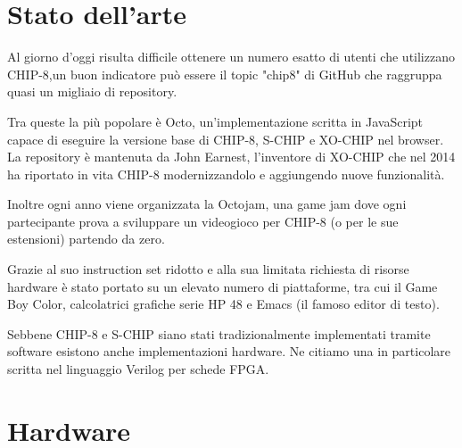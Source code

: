 \documentclass[a4paper]{article}
\begin{document}
\section{Stato dell'arte}

Al giorno d'oggi risulta difficile ottenere un numero esatto di utenti che
utilizzano CHIP-8,un buon indicatore può essere il topic "chip8" di GitHub
che raggruppa quasi un migliaio di repository.

Tra queste la più popolare è Octo, un'implementazione scritta in JavaScript
capace di eseguire la versione base di CHIP-8, S-CHIP e XO-CHIP nel browser.
La repository è mantenuta da John Earnest, l'inventore di XO-CHIP che nel 2014
ha riportato in vita CHIP-8 modernizzandolo e aggiungendo nuove funzionalità.

Inoltre ogni anno viene organizzata la Octojam, una game jam dove ogni partecipante
prova a sviluppare un videogioco per CHIP-8 (o per le sue estensioni) partendo da zero.

Grazie al suo instruction set ridotto e alla sua limitata richiesta di risorse hardware
è stato portato su un elevato numero di piattaforme, tra cui il Game Boy Color, calcolatrici
grafiche serie HP 48 e Emacs (il famoso editor di testo).

Sebbene CHIP-8 e S-CHIP siano stati tradizionalmente implementati tramite software
esistono anche implementazioni hardware. Ne citiamo una in particolare scritta nel
linguaggio Verilog per schede FPGA.

\section{Hardware}\label{sec:hardware}
\end{document}
